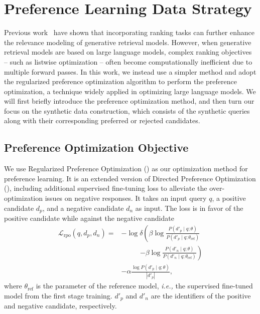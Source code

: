 \section{Preference Learning Data Strategy}
Previous work~\citep{zhou-etal-2023-enhancing-generative,DBLP:conf/aaai/00010WWL24} have shown that incorporating ranking tasks can further enhance the relevance modeling of generative retrieval models. However, when generative retrieval models are based on large language models, complex ranking objectives -- such as listwise optimization -- often become computationally inefficient due to multiple forward passes. In this work, we instead use a simpler method and adopt the regularized preference optimization algorithm to perform the preference optimization, a technique widely applied in optimizing large language models. We will first briefly introduce the preference optimization method, and then turn our focus on the synthetic data construction, which consists of the synthetic queries along with their corresponding preferred or rejected candidates.

\subsection{Preference Optimization Objective}
We use Regularized Preference Optimization (\citealp[RPO]{DBLP:journals/corr/abs-2404-19733}) as our optimization method for preference learning. It is an extended version of Directed Preference Optimization (\citealp[DPO]{DBLP:conf/nips/RafailovSMMEF23}), including additional supervised fine-tuning loss to alleviate the over-optimization issues on negative responses. It takes an input query $q$, a positive candidate $d_p$, and a negative candidate $d_n$ as input. The loss is in favor of the positive candidate while against the negative candidate
\begin{align*}
    \mathcal{L}_\text{rpo}\left(q, d_p, d_n\right) = &- \log \delta \left(  \beta\log \frac{P\left(d'_p\mid q; \theta\right)}{P\left(d'_p\mid q; \theta_\text{ref}\right)} \right.\\
    & \quad\quad\ \ \ \left. -\beta\log \frac{P\left(d'_n\mid q; \theta\right)}{P\left(d'_n\mid q; \theta_\text{ref}\right)} \right) \\
    & - \alpha\frac{\log P(d'_p \mid q; \theta)}{\left|d'_p\right|},
\end{align*}
where $\theta_\text{ref}$ is the parameter of the reference model, \textit{i.e.,} the supervised fine-tuned model from the first stage training. $d'_p$ and $d'_n$ are the identifiers of the positive and negative candidate, respectively.

